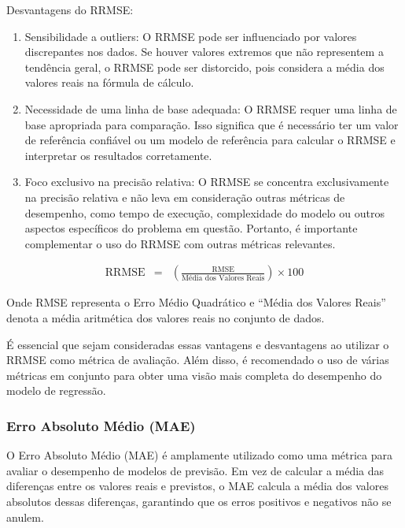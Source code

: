 Desvantagens do RRMSE:

\begin{enumerate}
	\item Sensibilidade a outliers: O RRMSE pode ser influenciado por valores discrepantes nos dados. Se houver valores extremos que não representem a tendência geral, o RRMSE pode ser distorcido, pois considera a média dos valores reais na fórmula de cálculo.
	
	\item Necessidade de uma linha de base adequada: O RRMSE requer uma linha de base apropriada para comparação. Isso significa que é necessário ter um valor de referência confiável ou um modelo de referência para calcular o RRMSE e interpretar os resultados corretamente.
	
	\item Foco exclusivo na precisão relativa: O RRMSE se concentra exclusivamente na precisão relativa e não leva em consideração outras métricas de desempenho, como tempo de execução, complexidade do modelo ou outros aspectos específicos do problema em questão. Portanto, é importante complementar o uso do RRMSE com outras métricas relevantes.
\end{enumerate}




\begin{eqnarray}
	\text{RRMSE} &=& \left(\frac{\text{RMSE}}{\text{Média dos Valores Reais}}\right) \times 100 \label{eq:rrmse}
\end{eqnarray}


Onde RMSE representa o Erro Médio Quadrático e ``Média dos Valores Reais'' denota a média aritmética dos valores reais no conjunto de dados.

É essencial que sejam consideradas essas vantagens e desvantagens ao utilizar o RRMSE como métrica de avaliação. Além disso, é recomendado o uso de várias métricas em conjunto para obter uma visão mais completa do desempenho do modelo de regressão.



\subsubsection{Erro Absoluto M\'edio (MAE)}

O Erro Absoluto Médio (MAE) é amplamente utilizado como uma métrica para avaliar o desempenho de modelos de previsão. Em vez de calcular a média das diferenças entre os valores reais e previstos, o MAE calcula a média dos valores absolutos dessas diferenças, garantindo que os erros positivos e negativos não se anulem.

